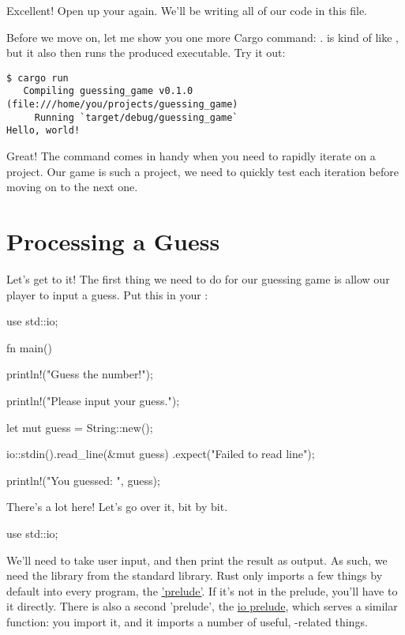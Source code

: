 Excellent! Open up your  again. We'll be writing all of our code in this file.

\blank

Before we move on, let me show you one more Cargo command: .  is kind of like , 
but it also then runs the produced executable. Try it out:

\begin{verbatim}
$ cargo run
   Compiling guessing_game v0.1.0 (file:///home/you/projects/guessing_game)
     Running `target/debug/guessing_game`
Hello, world!
\end{verbatim}

Great! The  command comes in handy when you need to rapidly iterate on a project. Our game is such a project, we 
need to quickly test each iteration before moving on to the next one.

\section{Processing a Guess}

Let's get to it! The first thing we need to do for our guessing game is allow our player to input a guess. Put this in your 
:

\begin{rustc}
use std::io;

fn main() {
    println!("Guess the number!");

    println!("Please input your guess.");

    let mut guess = String::new();

    io::stdin().read_line(&mut guess)
        .expect("Failed to read line");

    println!("You guessed: {}", guess);
}
\end{rustc}

There's a lot here! Let's go over it, bit by bit.

\begin{rustc}
use std::io;
\end{rustc}

We'll need to take user input, and then print the result as output. As such, we need the  library from the standard 
library. Rust only imports a few things by default into every program, the \href{https://doc.rust-lang.org/std/prelude/}{'prelude'}.
If it's not in the prelude, you'll have to  it directly. There is also a second 'prelude', the 
\href{https://doc.rust-lang.org/std/io/prelude/}{io prelude}, which serves a similar function: you import it, and it imports a 
number of useful, -related things.

